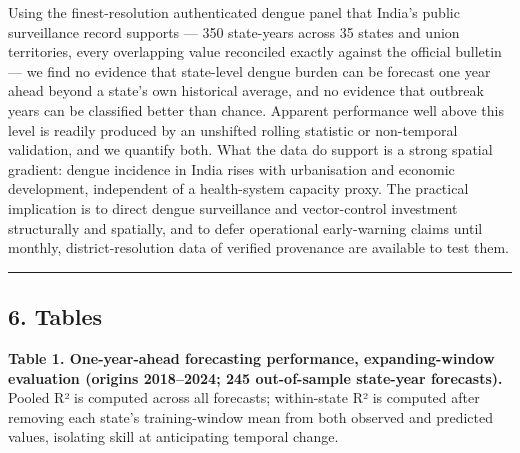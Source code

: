 \documentclass[
  10pt,
  twocolumn]{article}
\begin{document}
Using the finest-resolution authenticated dengue panel that India's
public surveillance record supports --- 350 state-years across 35 states
and union territories, every overlapping value reconciled exactly
against the official bulletin --- we find no evidence that state-level
dengue burden can be forecast one year ahead beyond a state's own
historical average, and no evidence that outbreak years can be
classified better than chance. Apparent performance well above this
level is readily produced by an unshifted rolling statistic or
non-temporal validation, and we quantify both. What the data do support
is a strong spatial gradient: dengue incidence in India rises with
urbanisation and economic development, independent of a health-system
capacity proxy. The practical implication is to direct dengue
surveillance and vector-control investment structurally and spatially,
and to defer operational early-warning claims until monthly,
district-resolution data of verified provenance are available to test
them.

\begin{center}\rule{0.5\linewidth}{0.5pt}\end{center}

\subsection{6. Tables}\label{tables}

\textbf{Table 1. One-year-ahead forecasting performance,
expanding-window evaluation (origins 2018--2024; 245 out-of-sample
state-year forecasts).} Pooled R² is computed across all forecasts;
within-state R² is computed after removing each state's training-window
mean from both observed and predicted values, isolating skill at
anticipating temporal change.
\end{document}
